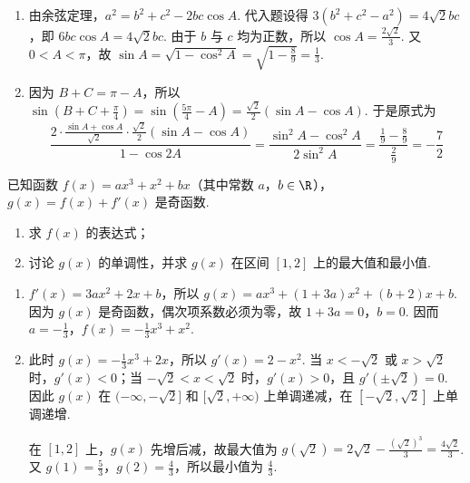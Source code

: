 \begin{solution}
\begin{enumerate}
\item 由余弦定理，\(a^2=b^2+c^2-2bc\cos A\). 代入题设得 \(3(b^2+c^2-a^2)=4\sqrt{2}bc\)，即 \(6bc\cos A=4\sqrt{2}bc\). 由于 \(b\) 与 \(c\) 均为正数，所以 \(\cos A=\frac{2\sqrt{2}}{3}\). 又 \(0<A<\pi\)，故 \(\sin A=\sqrt{1-\cos^2A}=\sqrt{1-\frac{8}{9}}=\frac{1}{3}\).
\item 因为 \(B+C=\pi-A\)，所以 \(\sin\left(B+C+\frac{\pi}{4}\right)=\sin\left(\frac{5\pi}{4}-A\right)=\frac{\sqrt{2}}{2}(\sin A-\cos A)\). 于是原式为
\[
\frac{2\cdot\frac{\sin A+\cos A}{\sqrt{2}}\cdot\frac{\sqrt{2}}{2}(\sin A-\cos A)}{1-\cos2A}
=\frac{\sin^2A-\cos^2A}{2\sin^2A}
=\frac{\frac{1}{9}-\frac{8}{9}}{\frac{2}{9}}
=-\frac{7}{2}
\]
\end{enumerate}
\end{solution}

\begin{problem}
已知函数 \( f(x) = ax^3 + x^2 + bx \)（其中常数 \(a\)，\(b \in \R\)），\( g(x) = f(x) + f'(x) \) 是奇函数.
\begin{enumerate}
\item 求 \( f(x) \) 的表达式；
\item 讨论 \( g(x) \) 的单调性，并求 \( g(x) \) 在区间 \( [1,2] \) 上的最大值和最小值.
\end{enumerate}
\end{problem}

\begin{solution}
\begin{enumerate}
\item \(f'(x)=3ax^2+2x+b\)，所以 \(g(x)=ax^3+(1+3a)x^2+(b+2)x+b\). 因为 \(g(x)\) 是奇函数，偶次项系数必须为零，故 \(1+3a=0\)，\(b=0\). 因而 \(a=-\frac{1}{3}\)，\(f(x)=-\frac{1}{3}x^3+x^2\).
\item 此时 \(g(x)=-\frac{1}{3}x^3+2x\)，所以 \(g'(x)=2-x^2\). 当 \(x<-\sqrt{2}\) 或 \(x>\sqrt{2}\) 时，\(g'(x)<0\)；当 \(-\sqrt{2}<x<\sqrt{2}\) 时，\(g'(x)>0\)，且 \(g'(\pm\sqrt{2})=0\). 因此 \(g(x)\) 在 \((-\infty,-\sqrt{2}]\) 和 \([\sqrt{2},+\infty)\) 上单调递减，在 \([-\sqrt{2},\sqrt{2}]\) 上单调递增.

在 \([1,2]\) 上，\(g(x)\) 先增后减，故最大值为 \(g(\sqrt{2})=2\sqrt{2}-\frac{(\sqrt{2})^3}{3}=\frac{4\sqrt{2}}{3}\). 又 \(g(1)=\frac{5}{3}\)，\(g(2)=\frac{4}{3}\)，所以最小值为 \(\frac{4}{3}\).
\end{enumerate}
\end{solution}

